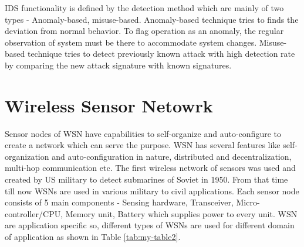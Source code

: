 \par
IDS functionality is defined by the detection method which are mainly of two types - Anomaly-based, misuse-based. Anomaly-based technique tries to finds the deviation from normal behavior. To flag operation as an anomaly, the regular observation of system must be there to accommodate system changes. Misuse-based technique tries to detect previously known attack with high detection rate by comparing the new attack signature with known signatures.

\section{Wireless Sensor Netowrk}
Sensor nodes of WSN have capabilities to self-organize and auto-configure to create a network which can serve the purpose. WSN has several features like self-organization and auto-configuration in nature, distributed and decentralization, multi-hop communication etc. The first wireless network of sensors was used and created by US military to detect submarines of Soviet in 1950. From that time till now WSNs are used in various military to civil applications. Each sensor node consists of 5 main components - Sensing hardware, Transceiver, Micro-controller/CPU, Memory unit, Battery which supplies power to every unit. WSN are application specific so, different types of WSNs are used for different domain of application \cite{articleTypesWSN} as shown in Table \ref{tab:my-table2}.
\begin{table}[htp]
\centering
\caption{Types of WSN.}
\label{tab:my-table2}
\end{table}


